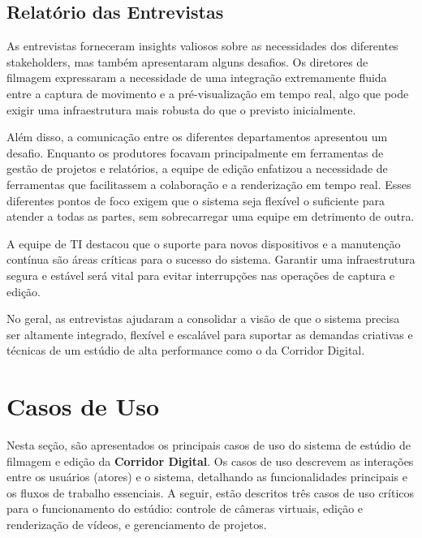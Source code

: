 \subsection{Relatório das Entrevistas}

As entrevistas forneceram insights valiosos sobre as necessidades dos diferentes stakeholders, mas também apresentaram alguns desafios. Os diretores de filmagem expressaram a necessidade de uma integração extremamente fluida entre a captura de movimento e a pré-visualização em tempo real, algo que pode exigir uma infraestrutura mais robusta do que o previsto inicialmente.

Além disso, a comunicação entre os diferentes departamentos apresentou um desafio. Enquanto os produtores focavam principalmente em ferramentas de gestão de projetos e relatórios, a equipe de edição enfatizou a necessidade de ferramentas que facilitassem a colaboração e a renderização em tempo real. Esses diferentes pontos de foco exigem que o sistema seja flexível o suficiente para atender a todas as partes, sem sobrecarregar uma equipe em detrimento de outra.

A equipe de TI destacou que o suporte para novos dispositivos e a manutenção contínua são áreas críticas para o sucesso do sistema. Garantir uma infraestrutura segura e estável será vital para evitar interrupções nas operações de captura e edição.

No geral, as entrevistas ajudaram a consolidar a visão de que o sistema precisa ser altamente integrado, flexível e escalável para suportar as demandas criativas e técnicas de um estúdio de alta performance como o da Corridor Digital.


\section{Casos de Uso}

Nesta seção, são apresentados os principais casos de uso do sistema de estúdio de filmagem e edição da \textbf{Corridor Digital}. Os casos de uso descrevem as interações entre os usuários (atores) e o sistema, detalhando as funcionalidades principais e os fluxos de trabalho essenciais. A seguir, estão descritos três casos de uso críticos para o funcionamento do estúdio: controle de câmeras virtuais, edição e renderização de vídeos, e gerenciamento de projetos.

